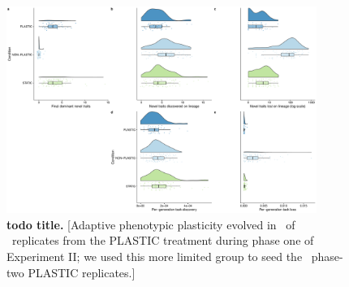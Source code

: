 \begin{figure}[h!]
    \centering
    \includegraphics[width=0.9\textwidth]{media/complex-traits-panel.pdf}
    \caption{\small
    \textbf{todo title.}
    [Adaptive phenotypic plasticity evolved in \novelTraitsPlasticReps\ of \novelTraitsReplicates\ replicates from the PLASTIC treatment during phase one of Experiment II; we used this more limited group to seed the \novelTraitsPlasticReps\ phase-two PLASTIC replicates.]
    }
    \label{fig:complex-traits}
\end{figure}